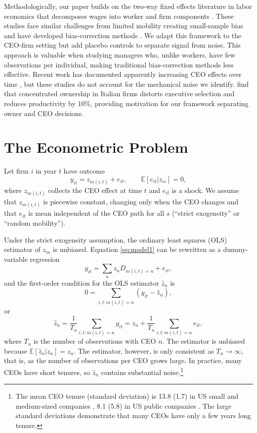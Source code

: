 \documentclass[11pt,a4paper]{article}
\begin{document}
Methodologically, our paper builds on the two-way fixed effects literature in labor economics that decomposes wages into worker and firm components \citep{Abowd1999Econometrica, Card2018JoLE}. These studies face similar challenges from limited mobility creating small-sample bias \citep{andrews2008high} and have developed bias-correction methods \citep{Bonhomme2023-dx, gaure2014correlation}. We adapt this framework to the CEO-firm setting but add placebo controls to separate signal from noise. This approach is valuable when studying managers who, unlike workers, have few observations per individual, making traditional bias-correction methods less effective. Recent work has documented apparently increasing CEO effects over time \citep{quigley2015has}, but these studies do not account for the mechanical noise we identify. \citet{lippi2014corporate} find that concentrated ownership in Italian firms distorts executive selection and reduces productivity by 10\%, providing motivation for our framework separating owner and CEO decisions.

\section{The Econometric Problem}

Let firm $i$ in year $t$ have outcome
\begin{equation}\label{eq:model1}
  y_{it} = z_{m(i,t)} + e_{it},\qquad \mathbb E[e_{it}|z_{is}]=0,
\end{equation}
where $z_{m(i,t)}$ collects the CEO effect at time $t$ and $e_{it}$ is a shock. We assume that $z_{m(i,t)}$ is piecewise constant, changing only when the CEO changes and that $e_{it}$ is mean independent of the CEO path for all $s$ (``strict exogeneity'' or ``random mobility'').

Under the strict exogeneity assumption, the ordinary least squares (OLS) estimator of $z_m$ is unbiased. Equation \eqref{eq:model1} can be rewritten as a dummy-variable regression 
$$
y_{it} = \sum_{n} z_n D_{m(i,t)=n}  + e_{it},
$$
and the first-order condition for the OLS estimator $\hat z_n$ is
$$
0 = \sum_{i,t:m(i,t)=n} (y_{it} - \hat z_n),
$$
or 
$$
\hat z_n = \frac{1}{T_n} \sum_{i,t:m(i,t)=n} y_{it} = z_n + \frac{1}{T_n} \sum_{i,t:m(i,t)=n} e_{it},
$$
where $T_n$ is the number of observations with CEO $n$. The estimator is unbiased because $\mathbb E[\hat z_n|z_n] = z_n$. The estimator, however, is only consistent as $T_n\to\infty$, that is, as the number of observations per CEO grows large. In practice, many CEOs have short tenures, so $\hat z_n$ contains substantial noise.\footnote{The mean CEO tenure (standard deviation) is 13.8 (1.7) in US small and medium-sized companies \citep{simsek2007ceo}, 8.1 (5.8) in US public companies \citep{brookman2009ceo}. The large standard deviations demonstrate that many CEOs have only a few years long tenure.} 
\end{document}
